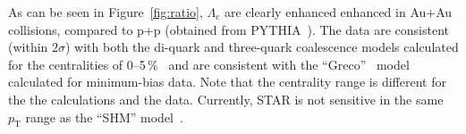 As can be seen in Figure~\ref{fig:ratio}, $\Lambda_\mathrm{c}$ are clearly enhanced enhanced in Au+Au collisions, compared to p+p (obtained from PYTHIA~\cite{PYTHIA}). The data are consistent (within $2\sigma$) with both the di-quark and three-quark coalescence models calculated for the centralities of 0--5$\,\%$~\cite{LcCoalescence_OhKoLeeYasui} and are consistent with the ``Greco''~\cite{Ghosh_Lc_rescattering} model calculated for minimum-bias data. Note that the centrality range is different for the the calculations and the data. Currently, STAR is not sensitive in the same $p_\mathrm{T}$ range as the ``SHM'' model~\cite{SHM}. 



% 



